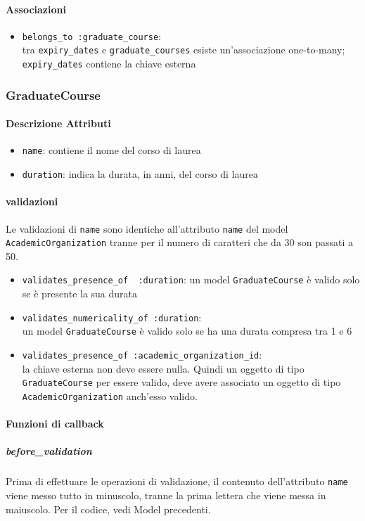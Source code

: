 \documentclass[11pt,a4paper]{article}
\begin{document}
\paragraph{Associazioni}
\begin{itemize}
 \item \verb|belongs_to :graduate_course|:\\ tra \verb|expiry_dates| e \verb|graduate_courses| esiste un'associazione one-to-many; \verb|expiry_dates| contiene la chiave esterna
\end{itemize}
\subsubsection{GraduateCourse}
\paragraph{Descrizione Attributi}
\begin{itemize}
 \item \verb|name|: contiene il nome del corso di laurea
 \item \verb|duration|: indica la durata, in anni, del corso di laurea
\end{itemize}
\paragraph{validazioni}
Le validazioni di \verb|name| sono identiche all'attributo \verb|name| del model \verb|AcademicOrganization| tranne per il numero di caratteri che da 30 son passati a 50.
\begin{itemize}
\item \verb|validates_presence_of  :duration|: un model \verb|GraduateCourse| è valido solo se è presente la sua durata 
\item \verb|validates_numericality_of :duration|:\\un model \verb|GraduateCourse| è valido solo se ha una durata compresa tra 1 e 6
 \item \verb|validates_presence_of :academic_organization_id|:\\ la chiave esterna non deve essere nulla. Quindi un oggetto di tipo \verb|GraduateCourse| per essere valido, deve avere associato un oggetto di tipo \verb|AcademicOrganization| anch'esso valido.
\end{itemize}
\paragraph{Funzioni di callback}
\subparagraph{before\_validation}
Prima di effettuare le operazioni di validazione, il contenuto dell'attributo \verb|name| viene messo tutto in minuscolo, tranne la prima lettera che viene messa in maiuscolo. Per il codice, vedi Model precedenti.
\end{document}
